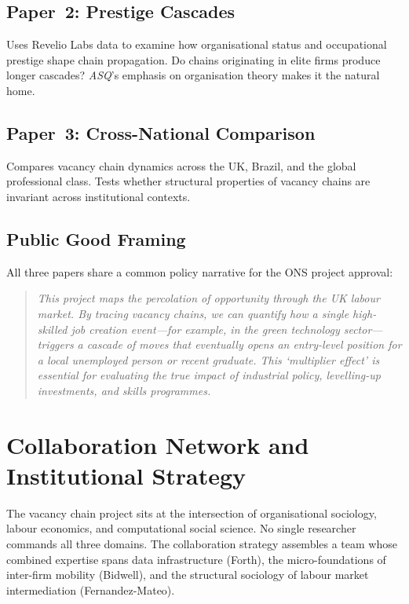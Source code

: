\documentclass[a4paper]{tufte-handout}
\begin{document}
\subsection{Paper~2: Prestige Cascades}
Uses Revelio Labs data to examine how organisational status and occupational prestige shape chain propagation. Do chains originating in elite firms produce longer cascades? \emph{ASQ}'s emphasis on organisation theory makes it the natural home.

\subsection{Paper~3: Cross-National Comparison}
Compares vacancy chain dynamics across the UK, Brazil, and the global professional class. Tests whether structural properties of vacancy chains are invariant across institutional contexts.

\subsection{Public Good Framing}

All three papers share a common policy narrative for the ONS project approval:

\begin{quote}
	\small\itshape
	This project maps the percolation of opportunity through the UK labour market. By tracing vacancy chains, we can quantify how a single high-skilled job creation event---for example, in the green technology sector---triggers a cascade of moves that eventually opens an entry-level position for a local unemployed person or recent graduate. This `multiplier effect' is essential for evaluating the true impact of industrial policy, levelling-up investments, and skills programmes.
\end{quote}


\section{Collaboration Network and Institutional Strategy}

The vacancy chain project sits at the intersection of organisational sociology, labour economics, and computational social science. No single researcher commands all three domains. The collaboration strategy assembles a team whose combined expertise spans data infrastructure (Forth), the micro-foundations of inter-firm mobility (Bidwell), and the structural sociology of labour market intermediation (Fernandez-Mateo).
\end{document}
